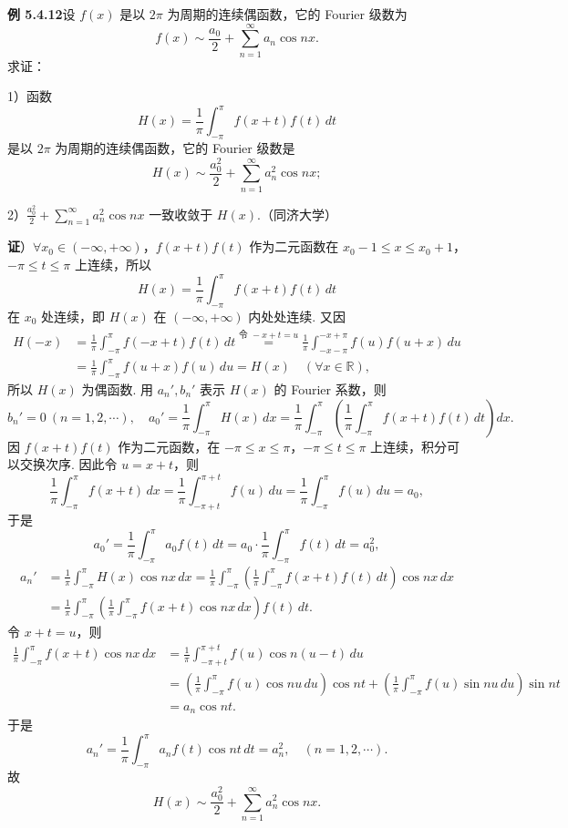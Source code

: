 \documentclass[UTF8,12pt,a4paper,fontset=fandol]{ctexart}
\providecommand{\xlongequal}[1]{\stackrel{#1}{=}}
\begin{document}
\noindent\textbf{例 5.4.12}\quad 设 $f(x)$ 是以 $2\pi$ 为周期的连续偶函数，它的 Fourier 级数为
\[
  f(x)\sim\frac{a_0}{2}+\sum_{n=1}^{\infty}a_n\cos nx.
\]
求证：

1）函数
\[
  H(x)=\frac1\pi\int_{-\pi}^{\pi}f(x+t)f(t)\,dt
\]
是以 $2\pi$ 为周期的连续偶函数，它的 Fourier 级数是
\[
  H(x)\sim\frac{a_0^2}{2}+\sum_{n=1}^{\infty}a_n^2\cos nx;
\]

2）$\displaystyle\frac{a_0^2}{2}+\sum_{n=1}^{\infty}a_n^2\cos nx$ 一致收敛于 $H(x)$.（同济大学）

\noindent\textbf{证}）$\forall x_0\in(-\infty,+\infty)$，$f(x+t)f(t)$ 作为二元函数在
$x_0-1\le x\le x_0+1$，$-\pi\le t\le\pi$ 上连续，所以
\[
  H(x)=\frac1\pi\int_{-\pi}^{\pi}f(x+t)f(t)\,dt
\]
在 $x_0$ 处连续，即 $H(x)$ 在 $(-\infty,+\infty)$ 内处处连续. 又因
\[
\begin{aligned}
H(-x)&=\frac1\pi\int_{-\pi}^{\pi}f(-x+t)f(t)\,dt
\xlongequal{\text{令 }-x+t=u}
\frac1\pi\int_{-x-\pi}^{-x+\pi}f(u)f(u+x)\,du\\
&=\frac1\pi\int_{-\pi}^{\pi}f(u+x)f(u)\,du=H(x)\quad(\forall x\in\mathbb R),
\end{aligned}
\]
所以 $H(x)$ 为偶函数. 用 $a_n',b_n'$ 表示 $H(x)$ 的 Fourier 系数，则
\[
  b_n'=0\ (n=1,2,\cdots),\quad
  a_0'=\frac1\pi\int_{-\pi}^{\pi}H(x)\,dx
  =\frac1\pi\int_{-\pi}^{\pi}\left(\frac1\pi\int_{-\pi}^{\pi}f(x+t)f(t)\,dt\right)dx.
\]
因 $f(x+t)f(t)$ 作为二元函数，在 $-\pi\le x\le\pi$，$-\pi\le t\le\pi$ 上连续，积分可以交换次序. 因此令 $u=x+t$，则
\[
  \frac1\pi\int_{-\pi}^{\pi}f(x+t)\,dx
  =\frac1\pi\int_{-\pi+t}^{\pi+t}f(u)\,du
  =\frac1\pi\int_{-\pi}^{\pi}f(u)\,du=a_0,
\]
于是
\[
  a_0'=\frac1\pi\int_{-\pi}^{\pi}a_0f(t)\,dt
  =a_0\cdot\frac1\pi\int_{-\pi}^{\pi}f(t)\,dt=a_0^2,
\]
\[
\begin{aligned}
a_n'&=\frac1\pi\int_{-\pi}^{\pi}H(x)\cos nx\,dx
=\frac1\pi\int_{-\pi}^{\pi}\left(\frac1\pi\int_{-\pi}^{\pi}f(x+t)f(t)\,dt\right)\cos nx\,dx\\
&=\frac1\pi\int_{-\pi}^{\pi}\left(\frac1\pi\int_{-\pi}^{\pi}f(x+t)\cos nx\,dx\right)f(t)\,dt.
\end{aligned}
\]
令 $x+t=u$，则
\[
\begin{aligned}
\frac1\pi\int_{-\pi}^{\pi}f(x+t)\cos nx\,dx
&=\frac1\pi\int_{-\pi+t}^{\pi+t}f(u)\cos n(u-t)\,du\\
&=\left(\frac1\pi\int_{-\pi}^{\pi}f(u)\cos nu\,du\right)\cos nt
+\left(\frac1\pi\int_{-\pi}^{\pi}f(u)\sin nu\,du\right)\sin nt\\
&=a_n\cos nt.
\end{aligned}
\]
于是
\[
  a_n'=\frac1\pi\int_{-\pi}^{\pi}a_nf(t)\cos nt\,dt=a_n^2,\quad(n=1,2,\cdots).
\]
故
\[
  H(x)\sim\frac{a_0^2}{2}+\sum_{n=1}^{\infty}a_n^2\cos nx.
\]
\end{document}
